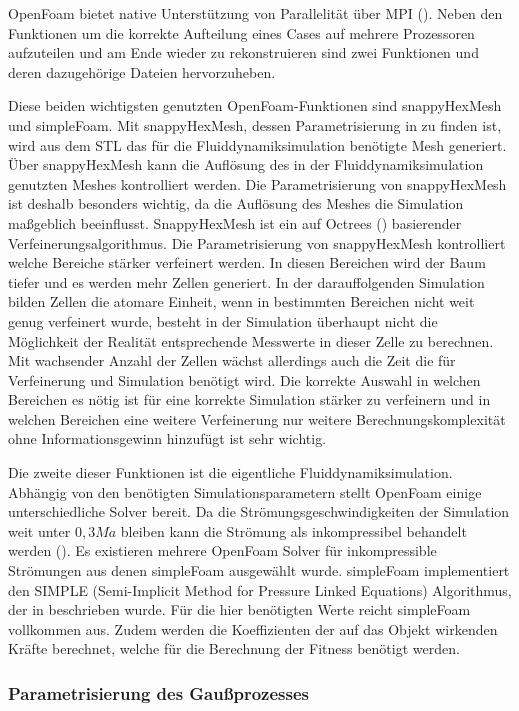 OpenFoam bietet native Unterstützung von Parallelität über MPI (\cite{OpenMPI.}).
Neben den Funktionen um die korrekte Aufteilung eines Cases auf mehrere Prozessoren aufzuteilen und am Ende wieder zu rekonstruieren sind zwei Funktionen und deren dazugehörige Dateien hervorzuheben.

Diese beiden wichtigsten genutzten OpenFoam-Funktionen sind snappyHexMesh und simpleFoam.
Mit snappyHexMesh, dessen Parametrisierung in  zu finden ist, wird aus dem STL das für die Fluiddynamiksimulation benötigte Mesh generiert. Über snappyHexMesh kann die Auflösung des in der Fluiddynamiksimulation genutzten Meshes kontrolliert werden.
Die Parametrisierung von snappyHexMesh ist deshalb besonders wichtig, da die Auflösung des Meshes die Simulation maßgeblich beeinflusst.
SnappyHexMesh ist ein auf Octrees (\cite{Meagher.1982}) basierender Verfeinerungsalgorithmus.
Die Parametrisierung von snappyHexMesh kontrolliert welche Bereiche stärker verfeinert werden.
In diesen Bereichen wird der Baum tiefer und es werden mehr Zellen generiert.
In der darauffolgenden Simulation bilden Zellen die atomare Einheit, wenn in bestimmten Bereichen nicht weit genug verfeinert wurde, besteht in der Simulation überhaupt nicht die Möglichkeit der Realität entsprechende Messwerte in dieser Zelle zu berechnen.
Mit wachsender Anzahl der Zellen wächst allerdings auch die Zeit die für Verfeinerung und Simulation benötigt wird.
Die korrekte Auswahl in welchen Bereichen es nötig ist für eine korrekte Simulation stärker zu verfeinern und in welchen Bereichen eine weitere Verfeinerung nur weitere Berechnungskomplexität ohne Informationsgewinn hinzufügt ist sehr wichtig. 

Die zweite dieser Funktionen ist die eigentliche Fluiddynamiksimulation.
Abhängig von den benötigten Simulationsparametern stellt OpenFoam einige unterschiedliche Solver bereit.
Da die Strömungsgeschwindigkeiten der Simulation weit unter $0,3Ma$ bleiben kann die Strömung als inkompressibel behandelt werden (\cite{Anderson.2017}).
Es existieren mehrere OpenFoam Solver für inkompressible Strömungen aus denen simpleFoam ausgewählt wurde.
simpleFoam implementiert den SIMPLE (Semi-Implicit Method for Pressure Linked Equations) Algorithmus, der in \cite{Caretto.1973} beschrieben wurde.
Für die hier benötigten Werte reicht simpleFoam vollkommen aus.
Zudem werden die Koeffizienten der auf das Objekt wirkenden Kräfte berechnet, welche für die Berechnung der Fitness benötigt werden. 

\subsubsection{Parametrisierung des Gaußprozesses}

